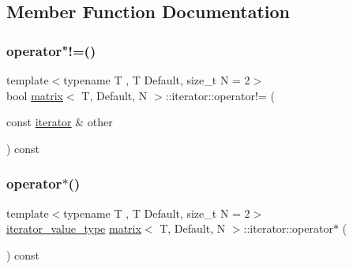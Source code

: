\subsection{Member Function Documentation}
\mbox{\label{structmatrix_1_1iterator_ad60f23552a67ebdf788a48b865f0e04f}} 
\subsubsection{\texorpdfstring{operator"!=()}{operator!=()}}
{\footnotesize\ttfamily template$<$typename T , T Default, size\+\_\+t N = 2$>$ \\
bool \hyperlink{structmatrix}{matrix}$<$ T, Default, N $>$\+::iterator\+::operator!= (\begin{DoxyParamCaption}\item[{const \hyperlink{structmatrix_1_1iterator}{iterator} \&}]{other }\end{DoxyParamCaption}) const\hspace{0.3cm}{\ttfamily [inline]}}

\mbox{\label{structmatrix_1_1iterator_a3c50e59b2011ffab21b41c94b0de1657}} 
\subsubsection{\texorpdfstring{operator$\ast$()}{operator*()}}
{\footnotesize\ttfamily template$<$typename T , T Default, size\+\_\+t N = 2$>$ \\
\hyperlink{structmatrix_a54b3613a5cf2df7a45556b017ebe306f}{iterator\+\_\+value\+\_\+type} \hyperlink{structmatrix}{matrix}$<$ T, Default, N $>$\+::iterator\+::operator$\ast$ (\begin{DoxyParamCaption}{ }\end{DoxyParamCaption}) const\hspace{0.3cm}{\ttfamily [inline]}}

\mbox{\label{structmatrix_1_1iterator_a846675c38c58ac5954911ff9281d6b45}} 

